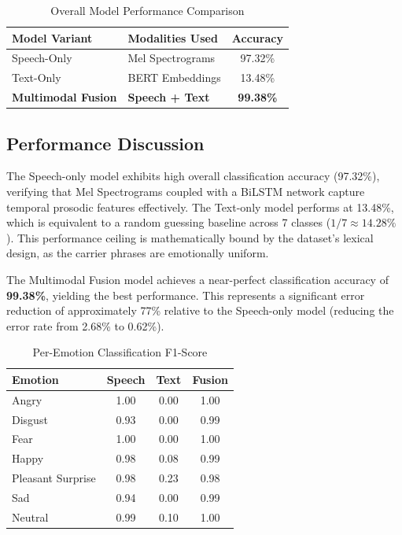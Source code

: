 \documentclass[11pt,journal,onecolumn]{IEEEtran}
\begin{document}
\begin{table}[H]
\centering
\caption{Overall Model Performance Comparison}
\label{tab:overall_perf}
\begin{tabular}{>{\raggedright\arraybackslash}p{4cm} >{\raggedright\arraybackslash}p{5cm} c}
\toprule
\textbf{Model Variant} & \textbf{Modalities Used} & \textbf{Accuracy} \\
\midrule
Speech-Only & Mel Spectrograms & 97.32\% \\
Text-Only & BERT Embeddings & 13.48\% \\
\textbf{Multimodal Fusion} & \textbf{Speech + Text} & \textbf{99.38\%} \\
\bottomrule
\end{tabular}
\end{table}

\subsection{Performance Discussion}
The Speech-only model exhibits high overall classification accuracy (97.32\%), verifying that Mel Spectrograms coupled with a BiLSTM network capture temporal prosodic features effectively. The Text-only model performs at 13.48\%, which is equivalent to a random guessing baseline across 7 classes ($1/7 \approx 14.28\%$). This performance ceiling is mathematically bound by the dataset's lexical design, as the carrier phrases are emotionally uniform. 

The Multimodal Fusion model achieves a near-perfect classification accuracy of \textbf{99.38\%}, yielding the best performance. This represents a significant error reduction of approximately 77\% relative to the Speech-only model (reducing the error rate from 2.68\% to 0.62\%). 

\begin{table}[H]
\centering
\caption{Per-Emotion Classification F1-Score}
\label{tab:per_emotion_f1}
\begin{tabular}{lccc}
\toprule
\textbf{Emotion} & \textbf{Speech} & \textbf{Text} & \textbf{Fusion} \\
\midrule
Angry & 1.00 & 0.00 & 1.00 \\
Disgust & 0.93 & 0.00 & 0.99 \\
Fear & 1.00 & 0.00 & 1.00 \\
Happy & 0.98 & 0.08 & 0.99 \\
Pleasant Surprise & 0.98 & 0.23 & 0.98 \\
Sad & 0.94 & 0.00 & 0.99 \\
Neutral & 0.99 & 0.10 & 1.00 \\
\bottomrule
\end{tabular}
\end{table}
\end{document}
